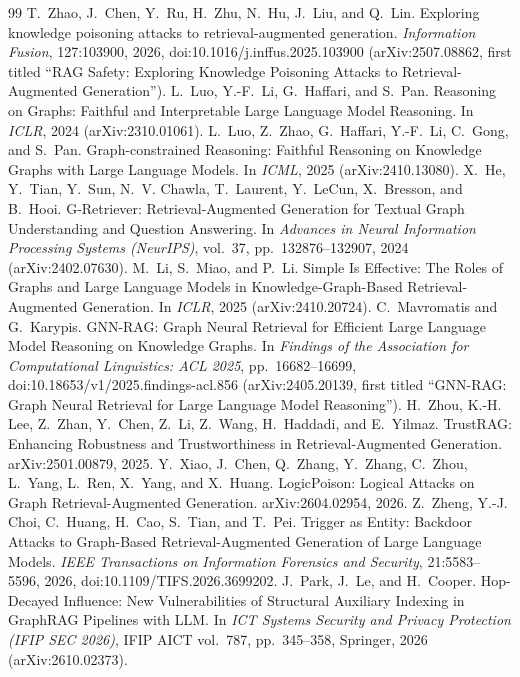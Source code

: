 \documentclass[preprint,12pt]{elsarticle}
\begin{document}
\begin{thebibliography}{99}\small
{} T.~Zhao, J.~Chen, Y.~Ru, H.~Zhu, N.~Hu, J.~Liu, and Q.~Lin. Exploring knowledge poisoning attacks to retrieval-augmented generation. \emph{Information Fusion}, 127:103900, 2026, doi:10.1016/j.inffus.2025.103900 (arXiv:2507.08862, first titled ``RAG Safety: Exploring Knowledge Poisoning Attacks to Retrieval-Augmented Generation'').
 L.~Luo, Y.-F.~Li, G.~Haffari, and S.~Pan. Reasoning on Graphs: Faithful and Interpretable Large Language Model Reasoning. In \emph{ICLR}, 2024 (arXiv:2310.01061).
 L.~Luo, Z.~Zhao, G.~Haffari, Y.-F.~Li, C.~Gong, and S.~Pan. Graph-constrained Reasoning: Faithful Reasoning on Knowledge Graphs with Large Language Models. In \emph{ICML}, 2025 (arXiv:2410.13080).
 X.~He, Y.~Tian, Y.~Sun, N.~V. Chawla, T.~Laurent, Y.~LeCun, X.~Bresson, and B.~Hooi. G-Retriever: Retrieval-Augmented Generation for Textual Graph Understanding and Question Answering. In \emph{Advances in Neural Information Processing Systems (NeurIPS)}, vol.~37, pp.~132876--132907, 2024 (arXiv:2402.07630).
 M.~Li, S.~Miao, and P.~Li. Simple Is Effective: The Roles of Graphs and Large Language Models in Knowledge-Graph-Based Retrieval-Augmented Generation. In \emph{ICLR}, 2025 (arXiv:2410.20724).
 C.~Mavromatis and G.~Karypis. GNN-RAG: Graph Neural Retrieval for Efficient Large Language Model Reasoning on Knowledge Graphs. In \emph{Findings of the Association for Computational Linguistics: ACL 2025}, pp.~16682--16699, doi:10.18653/v1/2025.findings-acl.856 (arXiv:2405.20139, first titled ``GNN-RAG: Graph Neural Retrieval for Large Language Model Reasoning'').
 H.~Zhou, K.-H. Lee, Z.~Zhan, Y.~Chen, Z.~Li, Z.~Wang, H.~Haddadi, and E.~Yilmaz. TrustRAG: Enhancing Robustness and Trustworthiness in Retrieval-Augmented Generation. arXiv:2501.00879, 2025.
 Y.~Xiao, J.~Chen, Q.~Zhang, Y.~Zhang, C.~Zhou, L.~Yang, L.~Ren, X.~Yang, and X.~Huang. LogicPoison: Logical Attacks on Graph Retrieval-Augmented Generation. arXiv:2604.02954, 2026.
 Z.~Zheng, Y.-J. Choi, C.~Huang, H.~Cao, S.~Tian, and T.~Pei. Trigger as Entity: Backdoor Attacks to Graph-Based Retrieval-Augmented Generation of Large Language Models. \emph{IEEE Transactions on Information Forensics and Security}, 21:5583--5596, 2026, doi:10.1109/TIFS.2026.3699202.
 J.~Park, J.~Le, and H.~Cooper. Hop-Decayed Influence: New Vulnerabilities of Structural Auxiliary Indexing in GraphRAG Pipelines with LLM. In \emph{ICT Systems Security and Privacy Protection (IFIP SEC 2026)}, IFIP AICT vol.~787, pp.~345--358, Springer, 2026 (arXiv:2610.02373).

\end{thebibliography}
\end{document}
